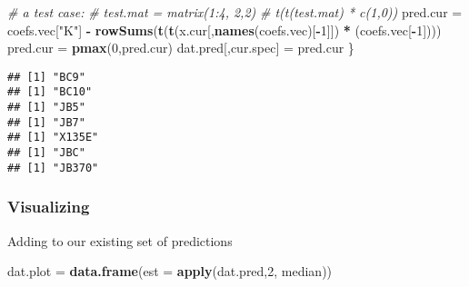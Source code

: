 \documentclass[
]{article}
\newenvironment{Shaded}{\begin{snugshade}}{\end{snugshade}}
\newcommand{\AttributeTok}[1]{\textcolor[rgb]{0.13,0.29,0.53}{#1}}
\newcommand{\CommentTok}[1]{\textcolor[rgb]{0.56,0.35,0.01}{\textit{#1}}}
\newcommand{\DecValTok}[1]{\textcolor[rgb]{0.00,0.00,0.81}{#1}}
\newcommand{\FunctionTok}[1]{\textcolor[rgb]{0.13,0.29,0.53}{\textbf{#1}}}
\newcommand{\NormalTok}[1]{#1}
\newcommand{\OtherTok}[1]{\textcolor[rgb]{0.56,0.35,0.01}{#1}}
\newcommand{\SpecialCharTok}[1]{\textcolor[rgb]{0.81,0.36,0.00}{\textbf{#1}}}
\newcommand{\StringTok}[1]{\textcolor[rgb]{0.31,0.60,0.02}{#1}}
\begin{document}
\begin{Shaded}
\begin{Highlighting}[]
  \CommentTok{\# a test case:}
  \CommentTok{\# test.mat = matrix(1:4, 2,2)}
  \CommentTok{\# t(t(test.mat) * c(1,0))}
\NormalTok{  pred.cur }\OtherTok{=}\NormalTok{ coefs.vec[}\StringTok{"K"}\NormalTok{] }\SpecialCharTok{{-}} 
    \FunctionTok{rowSums}\NormalTok{(}\FunctionTok{t}\NormalTok{(}\FunctionTok{t}\NormalTok{(x.cur[,}\FunctionTok{names}\NormalTok{(coefs.vec)[}\SpecialCharTok{{-}}\DecValTok{1}\NormalTok{]]) }\SpecialCharTok{*}\NormalTok{ (coefs.vec[}\SpecialCharTok{{-}}\DecValTok{1}\NormalTok{])))}
\NormalTok{  pred.cur }\OtherTok{=} \FunctionTok{pmax}\NormalTok{(}\DecValTok{0}\NormalTok{,pred.cur)}
\NormalTok{  dat.pred[,cur.spec] }\OtherTok{=}\NormalTok{ pred.cur}
\NormalTok{\}}
\end{Highlighting}
\end{Shaded}

\begin{verbatim}
## [1] "BC9"
## [1] "BC10"
## [1] "JB5"
## [1] "JB7"
## [1] "X135E"
## [1] "JBC"
## [1] "JB370"
\end{verbatim}

\begin{Shaded}
\end{Shaded}

\hypertarget{visualizing-1}{%
\subsubsection{Visualizing}\label{visualizing-1}}

Adding to our existing set of predictions

\begin{Shaded}
\begin{Highlighting}[]
\NormalTok{dat.plot }\OtherTok{=} \FunctionTok{data.frame}\NormalTok{(}\AttributeTok{est =} \FunctionTok{apply}\NormalTok{(dat.pred,}\DecValTok{2}\NormalTok{, median))}
\end{Highlighting}
\end{Shaded}
\end{document}
